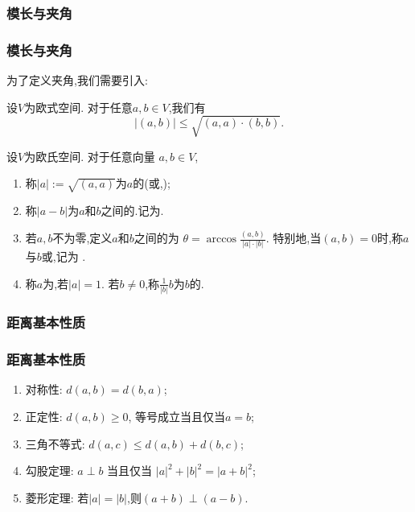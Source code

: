 \subsubsection{模长与夹角}
\begin{frame}\frametitle{模长与夹角}
\pp

为了定义夹角,我们需要引入:

\begin{theorem}
\pp
设$V$为欧式空间. 对于任意$a,b\in V$,我们有
\[|(a,b)|\leq \sqrt{(a,a)\cdot(b,b)}.\]
\end{theorem}
\pp
{}

\pp
{}
\pp
\begin{definition}[长度,夹角]
设$V$为欧氏空间. 对于任意向量 $a,b\in V$,
\begin{enumerate}
\item 称$|a|:=\sqrt{(a,a)}$为$a$的(或,);
\pp
\item 称$|a-b|$为$a$和$b$之间的.记为.
\pp
\item 若$a,b$不为零,定义$a$和$b$之间的为 $\theta = \arccos\frac{(a,b)}{|a|\cdot|b|}$.
\pp
特别地,当$(a,b)=0$时,称$a$与$b$或,记为 .
\pp
\item 称$a$为,若$|a|=1$.
\pp
若$b\neq0$,称$\frac{1}{|b|}b$为$b$的.
\end{enumerate}
\end{definition}
\end{frame}





\subsubsection{距离基本性质}
\begin{frame}\frametitle{距离基本性质}
\pp
\begin{proposition}
\begin{enumerate}
\item 对称性: $d(a,b)=d(b,a)$;
\pp
\item 正定性: $d(a,b)\geq0$, 等号成立当且仅当$a=b$;
\pp
\item 三角不等式: $d(a,c)\leq d(a,b)+ d(b,c)$;
\pp
\item 勾股定理: $a\perp b$ 当且仅当 $|a|^2+|b|^2=|a+b|^2$;
\pp
\item 菱形定理: 若$|a|=|b|$,则$(a+b)\perp(a-b)$.
\end{enumerate}
\end{proposition}
\end{frame}





